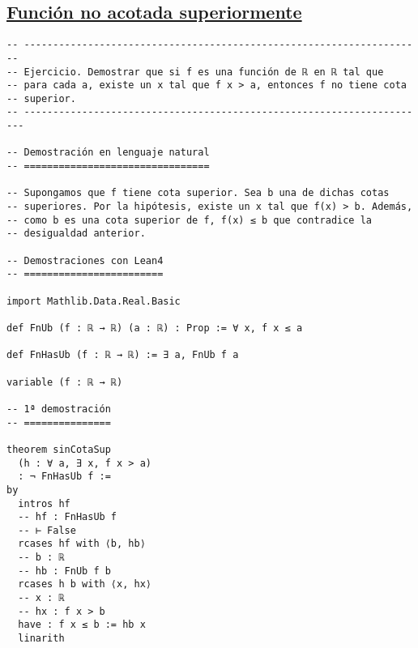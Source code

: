 \subsection{\href{./src/Logica/Funcion\_no\_acotada\_superiormente.lean}{Función no acotada superiormente}}
\label{sec:org9136489}
\begin{verbatim}
-- ---------------------------------------------------------------------
-- Ejercicio. Demostrar que si f es una función de ℝ en ℝ tal que
-- para cada a, existe un x tal que f x > a, entonces f no tiene cota
-- superior.
-- ----------------------------------------------------------------------

-- Demostración en lenguaje natural
-- ================================

-- Supongamos que f tiene cota superior. Sea b una de dichas cotas
-- superiores. Por la hipótesis, existe un x tal que f(x) > b. Además,
-- como b es una cota superior de f, f(x) ≤ b que contradice la
-- desigualdad anterior.

-- Demostraciones con Lean4
-- ========================

import Mathlib.Data.Real.Basic

def FnUb (f : ℝ → ℝ) (a : ℝ) : Prop := ∀ x, f x ≤ a

def FnHasUb (f : ℝ → ℝ) := ∃ a, FnUb f a

variable (f : ℝ → ℝ)

-- 1ª demostración
-- ===============

theorem sinCotaSup
  (h : ∀ a, ∃ x, f x > a)
  : ¬ FnHasUb f :=
by
  intros hf
  -- hf : FnHasUb f
  -- ⊢ False
  rcases hf with ⟨b, hb⟩
  -- b : ℝ
  -- hb : FnUb f b
  rcases h b with ⟨x, hx⟩
  -- x : ℝ
  -- hx : f x > b
  have : f x ≤ b := hb x
  linarith
\end{verbatim}

